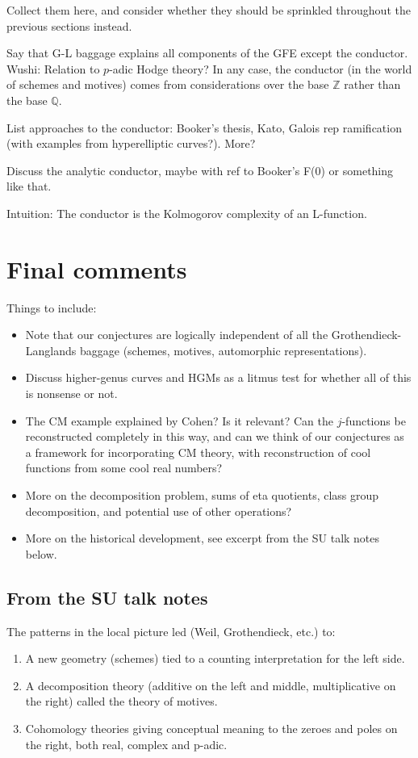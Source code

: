 \documentclass[paper=a4, fontsize=11pt]{scrartcl} %
\numberwithin{equation}{section} %
\numberwithin{figure}{section} %
\numberwithin{table}{section} %
\begin{document}
Collect them here, and consider whether they should be sprinkled throughout the previous sections instead.

Say that G-L baggage explains all components of the GFE except the conductor. Wushi: Relation to $p$-adic Hodge theory? In any case, the conductor (in the world of schemes and motives) comes from considerations over the base $\mathbb{Z}$ rather than the base $\mathbb{Q}$.

List approaches to the conductor: Booker's thesis, Kato, Galois rep ramification (with examples from hyperelliptic curves?). More?

Discuss the analytic conductor, maybe with ref to Booker's F(0) or something like that.

Intuition: The conductor is the Kolmogorov complexity of an L-function.

\section{Final comments}

Things to include:
\begin{itemize}
\item Note that our conjectures are logically independent of all the Grothendieck-Langlands baggage (schemes, motives, automorphic representations).
\item Discuss higher-genus curves and HGMs as a litmus test for whether all of this is nonsense or not.
\item The CM example explained by Cohen? Is it relevant? Can the $j$-functions be reconstructed completely in this way, and can we think of our conjectures as a framework for incorporating CM theory, with reconstruction of cool functions from some cool real numbers?
\item More on the decomposition problem, sums of eta quotients, class group decomposition, and potential use of other operations?
\item More on the historical development, see excerpt from the SU talk notes below.
\end{itemize}

\subsection*{From the SU talk notes}


The patterns in the local picture led (Weil, Grothendieck, etc.) to:

\begin{enumerate}
\item A new geometry (schemes) tied to a counting interpretation for the left side.
\item A decomposition theory (additive on the left and middle, multiplicative on the right) called the theory of motives.
\item Cohomology theories giving conceptual meaning to the zeroes and poles on the right, both real, complex and p-adic.
\end{enumerate}
\end{document}
